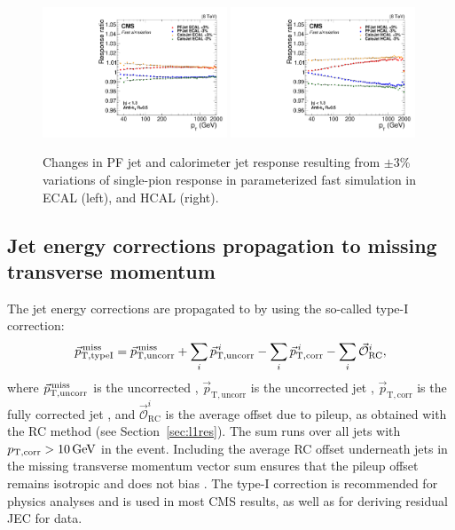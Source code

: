 \documentclass[11pt,twoside,a4paper,cmspaper,final,collab]{cms-tdr}
\begin{document}
\begin{figure}[htbp!]
\includegraphics[width=0.49\textwidth]{Figure_013-a.pdf}
\includegraphics[width=0.49\textwidth]{Figure_013-b.pdf}
\caption{\label{fig:spr}
Changes in PF jet and calorimeter jet response resulting from $\pm 3$\% variations of single-pion response in parameterized fast simulation in ECAL (left), and HCAL (right).
}
\end{figure}

\subsection{Jet energy corrections propagation to missing transverse momentum}
\label{sec:typeImet}
The jet energy corrections are propagated to \ptvecmiss by using the so-called type-I correction:
\begin{equation}
\vec{p}^{\, \rm miss}_\mathrm{T, typeI} = \vec{p}^{\, \rm miss}_\mathrm{T, uncorr} + \sum_i \vec{p}_\mathrm{T, uncorr}^{\, i} - \sum_i \vec{p}_\mathrm{T, corr}^{\, i} - \sum_i\vec{\mathcal{O}}_\mathrm{RC}^{i},\label{eq:typeImet}
\end{equation}
where $\vec{p}^{\, \rm miss}_\mathrm{T, uncorr}$ is the uncorrected \ptvecmiss, $\vec{p}_\mathrm{T, uncorr}$ is the uncorrected jet \pt, $\vec{p}_\mathrm{T, corr}$ is the fully corrected jet \pt, and $\vec{\mathcal{O}}_\mathrm{RC}^i$ is the average offset due to pileup, as obtained with the RC method (see Section~\ref{sec:l1res}).
The sum runs over all jets with $p_\mathrm{T, corr}>10\,\text{Ge\hspace{-.08em}V}$ in the event.
Including the average RC offset underneath jets in the missing transverse momentum vector sum ensures that the pileup offset remains isotropic and does not bias \ptvecmiss.
The type-I correction is recommended for physics analyses and is used in most CMS results, as well as for deriving residual JEC for data.
\end{document}
